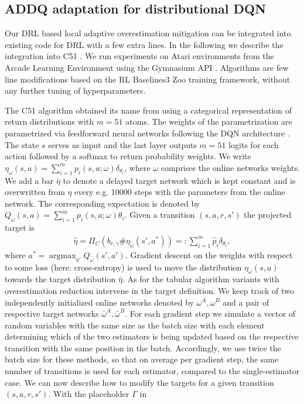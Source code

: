 \documentclass{article}
\theoremstyle{plain}
\theoremstyle{definition}
\theoremstyle{remark}
\begin{document}
\newpage
\subsection{ADDQ adaptation for distributional DQN}\label{sec:DQN}
Our DRL based local adaptive overestimation mitigation can be integrated into existing code for DRL with a few extra lines. In the following we describe the integration into C51 \cite{bellemare2017}. We run experiments on Atari environments from the Arcade Learning Environment \cite{ale} using the Gymnasium API \cite{gymnasium}. Algorithms are few line modifications based on the RL Baselines3 Zoo \cite{rl-zoo3} training framework, without any further tuning of hyperparameters.

The C51 algorithm obtained its name from using a categorical representation of return distributions with $m=51$ atoms. The weights of the parametrization are parametrized via feedforward neural networks following the DQN architecture \cite{dqn}. The state $s$ serves as input and the last layer outputs $m=51$ logits for each action followed by a softmax to return probability weights. 
%
We write $\eta_\omega(s,a)=\sum_{i=1}^mp_i(s,a;\omega)\delta_{\theta_i}$, 
where $\omega$ comprises the online networks weights. We add a bar $\bar \eta$ to denote a delayed target network which is kept constant and is overwritten from $\eta$ every e.g. 10000 steps with the parameters from the online network. The corresponding expectation is denoted by $Q_\omega(s,a)=\sum_{i=1}^mp_i(s,a;\omega)\theta_i.$ Given a transition $(s,a,r,s')$  the projected target is
\begin{align*}
\hat\eta
=\Pi_C(b_{r,\gamma}\#\eta_{\bar\omega}(s',a^*))=:\sum_{i=1}^m\hat p_i\delta_{\theta_i},
\end{align*} 
where $a^*=\operatorname{argmax}_{a'}Q_{\bar\omega}(s',a')$. Gradient descent on the weights with respect to some loss (here: cross-entropy) is used to move the distribution $\eta_\omega(s,a)$ towards the target distribution $\hat \eta$. As for the tabular algorithm variants with overestimation reduction intervene in the target definition. We keep track of two independently initialized online networks denoted by $\omega^A, \omega^B$ and a pair of respective target networks $\bar\omega^A, \bar\omega^B$. For each gradient step we simulate a vector of random variables with the same size as the batch size with each element determining which of the two estimators is being updated based on the respective transition with the same position in the batch. Accordingly, we use twice the batch size for these methods, so that on average per gradient step, the same number of transitions is used for each estimator, compared to the single-estimator case. We can now describe how to modify the targets for a given transition $(s,a,r,s')$. With the placeholder $\Gamma$ in 
\end{document}
